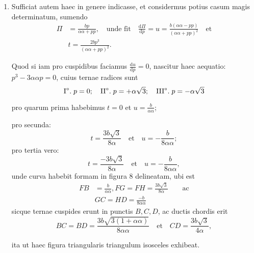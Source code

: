 \documentclass[10pt,a4paper]{article}
\def\D{\mathrm{d}}
\begin{document}
\begin{paracol}{2}
\begin{enumerate}[topsep=1px]
		\item Sufficiat autem haec in genere indicasse, et considermus potius casum magis determinatum, sumendo 
		\begin{align*}
			\Pi &= \frac{bp}{\alpha \alpha + pp},\quad \text{unde fit} \quad \frac{\D \Pi}{\D p} =u = \frac{b(\alpha\alpha- pp)}{(\alpha\alpha+pp)^2}\quad \text{et}\\
			&t = \frac{2bp^3}{(\alpha \alpha+pp)^2}.
		\end{align*}

		\par Quod si iam pro cuspidibus faciamus $\frac{\D u}{\D p}=0$, nascitur haec aequatio: $p^3-3\alpha \alpha p = 0$, cuius ternae radices sunt
		\[
			\text{I}\degree.\; p=0;\quad \text{II}\degree.\; p=+\alpha\sqrt{3};\quad  \text{III}\degree.\; p=-\alpha \sqrt{3}
		\]
		\par pro quarum prima habebimus $t=0$ et $u=\frac{b}{\alpha \alpha}$;
		\par pro secunda:
		\[
			t = \frac{3b\sqrt{3}}{8\alpha} \quad \text{et} \quad u = -\frac{b}{8\alpha \alpha};
		\]
		pro tertia vero:
		\[
			t = \frac{-3b\sqrt{3}}{8\alpha} \quad \text{et} \quad u = -\frac{b}{8\alpha \alpha},
		\]
		unde curva habebit formam in figura 8 delineatam, ubi est
		\begin{align*}
			FB &= \frac{b}{\alpha\alpha}, FG = FH = \frac{3b\sqrt{3}}{8\alpha} \qquad\text{ac}\\
			&GC=HD=\frac{-b}{8\alpha \alpha}
		\end{align*}
		sicque ternae cuspides erunt in punctis $B, C, D$, ac ductis chordis erit
		\[
			BC = BD = \frac{3b\sqrt{3(1+ \alpha \alpha)}}{8\alpha \alpha} \quad \text{et} \quad CD = \frac{3b\sqrt{3}}{4\alpha},
		\]
		\par ita ut haec figura triangularis triangulum isosceles exhibeat.
		

\end{enumerate}
\end{paracol}
\end{document}
